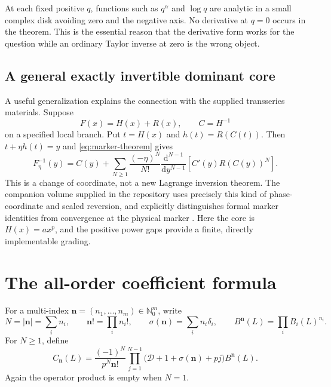 \documentclass[11pt,a4paper]{article}
\numberwithin{equation}{section}
\theoremstyle{definition}
\theoremstyle{remark}
\newcommand{\N}{\mathbb N_0}
\newcommand{\dd}{\mathrm d}
\newcommand{\D}{\mathcal D}
\begin{document}
At each fixed positive $q$, functions such as $q^\alpha$ and $\log q$ are
analytic in a small complex disk avoiding zero and the negative axis.
No derivative at $q=0$ occurs in the theorem. This is the essential reason
that the derivative form works for the question while an ordinary Taylor
inverse at zero is the wrong object.

\subsection{A general exactly invertible dominant core}

A useful generalization explains the connection with the supplied
transseries materials. Suppose
\[
 F(x)=H(x)+R(x),\qquad C=H^{-1}
\]
on a specified local branch. Put $t=H(x)$ and $h(t)=R(C(t))$. Then
$t+\eta h(t)=y$ and \eqref{eq:marker-theorem} gives
\begin{equation}
 F_\eta^{-1}(y)=C(y)+\sum_{N\ge1}\frac{(-\eta)^N}{N!}
 \frac{\dd^{N-1}}{\dd y^{N-1}}
 \left[C'(y)R(C(y))^N\right].
 \label{eq:general-core}
\end{equation}
This is a change of coordinate, not a new Lagrange inversion theorem.
The companion volume supplied in the repository uses precisely this kind
of phase-coordinate and scaled reversion, and explicitly distinguishes
formal marker identities from convergence at the physical marker
\cite{repocompanion}. Here the core is $H(x)=a x^p$, and the positive power
gaps provide a finite, directly implementable grading.

\section{The all-order coefficient formula}
\label{sec:master}

For a multi-index $\boldsymbol n=(n_1,\ldots,n_m)\in\N^m$, write
\begin{equation}
 N=|\boldsymbol n|=\sum_i n_i,\qquad
 \boldsymbol n!=\prod_i n_i!,\qquad
 \sigma(\boldsymbol n)=\sum_i n_i\delta_i,\qquad
 B^{\boldsymbol n}(L)=\prod_i B_i(L)^{n_i}.
 \label{eq:multiindex}
\end{equation}
For $N\ge1$, define
\begin{equation}
 C_{\boldsymbol n}(L)=
 \frac{(-1)^N}{p^N\boldsymbol n!}
 \prod_{j=1}^{N-1}\bigl(\D+1+\sigma(\boldsymbol n)+pj\bigr)
 B^{\boldsymbol n}(L).
 \label{eq:coefficient}
\end{equation}
Again the operator product is empty when $N=1$.
\end{document}
